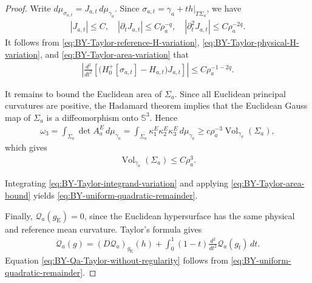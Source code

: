 \documentclass[10pt]{amsart}
\newcommand{\gE}{g_{\mathrm{E}}}
\newcommand{\Vol}{\operatorname{Vol}}
\theoremstyle{plain}
\theoremstyle{remark}
\begin{document}
\begin{proof}
		
		
		Write $d\mu_{\sigma_{a,t}}=
		J_{a,t}\,d\mu_{\gamma_a}$. Since $\sigma_{a,t}=\gamma_a+t h|_{T\Sigma_a}$, we have
		\begin{align}\label{eq:BY-Taylor-area-variation}
			|J_{a,t}|
			\leq
			C,
			\quad
			|\partial_tJ_{a,t}|
			\leq
			C\rho_a^{-q},
			\quad
			|\partial_t^2J_{a,t}|
			\leq
			C\rho_a^{-2q}.
		\end{align}
		It follows from
		\eqref{eq:BY-Taylor-reference-H-variation},
		\eqref{eq:BY-Taylor-physical-H-variation}, and
		\eqref{eq:BY-Taylor-area-variation} that
		\begin{align}\label{eq:BY-Taylor-integrand-variation}
			\left|
			\frac{d^2}{dt^2}
			\left[
			\bigl(H_0^+[\sigma_{a,t}]-H_{a,t}\bigr)J_{a,t}
			\right]
			\right|
			\leq
			C\rho_a^{-1-2q}.
		\end{align}
		
		It remains to bound the Euclidean area of $\Sigma_a$. Since all Euclidean
		principal curvatures are positive, the Hadamard theorem implies that the
		Euclidean Gauss map of $\Sigma_a$ is a diffeomorphism onto $\mathbb S^3$.
		Hence
		\begin{align*}
			\omega_3
			=\int_{\Sigma_a}
			\det A_a^E\,d\mu_{\gamma_a}
			=\int_{\Sigma_a}
			\kappa_1^E\kappa_2^E\kappa_3^E\,d\mu_{\gamma_a}
			\geq c\rho_a^{-3} \Vol_{\gamma_a}(\Sigma_a),
		\end{align*}
		which gives
		\begin{align}\label{eq:BY-Taylor-area-bound}
			\Vol_{\gamma_a}(\Sigma_a)
			\leq
			C\rho_a^3.
		\end{align}
		
		Integrating \eqref{eq:BY-Taylor-integrand-variation} and applying \eqref{eq:BY-Taylor-area-bound} yields \eqref{eq:BY-uniform-quadratic-remainder}.
		
		Finally, $\mathcal Q_a(\gE)=0$, since the Euclidean hypersurface has the
		same physical and reference mean curvature. Taylor's formula gives
		\begin{align*}
			\mathcal Q_a(g)
			=
			(D\mathcal Q_a)_{\gE}(h)
			+
			\int_0^1
			(1-t)
			\frac{d^2}{dt^2}\mathcal Q_a(g_t)\,dt.
		\end{align*}
		Equation \eqref{eq:BY-Qa-Taylor-without-regularity} follows from
		\eqref{eq:BY-uniform-quadratic-remainder}.
	\end{proof}
	
\end{document}
